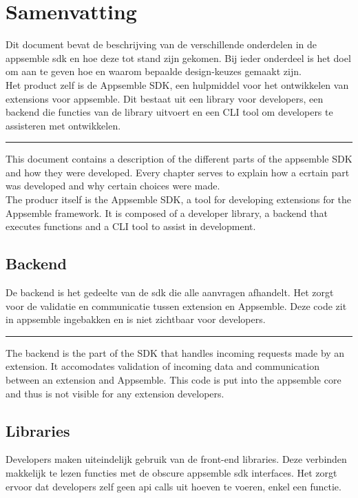 \chapter{Samenvatting}

Dit document bevat de beschrijving van de verschillende onderdelen in de appsemble sdk en hoe deze tot stand zijn gekomen. Bij ieder onderdeel is het doel om aan te geven hoe en waarom bepaalde design-keuzes gemaakt zijn. \\

Het product zelf is de Appsemble SDK, een hulpmiddel voor het ontwikkelen van extensions voor appsemble. Dit bestaat uit een library voor developers, een backend die functies van de library uitvoert en een CLI tool om developers te assisteren met ontwikkelen.

\noindent\rule[0.5ex]{\linewidth}{1pt}

This document contains a description of the different parts of the appsemble SDK and how they were developed. Every chapter serves to explain how a ecrtain part was developed and why certain choices were made. \\

The producr itself is the Appsemble SDK, a tool for developing extensions for the Appsemble framework. It is composed of a developer library, a backend that executes functions and a CLI tool to assist in development.

\section{Backend}

De backend is het gedeelte van de sdk die alle aanvragen afhandelt. Het zorgt voor de validatie en communicatie tussen extension en Appsemble. Deze code zit in appsemble ingebakken en is niet zichtbaar voor developers. 

\noindent\rule[0.5ex]{\linewidth}{1pt}

The backend is the part of the SDK that handles incoming requests made by an extension. It accomodates validation of incoming data and communication between an extension and Appsemble. This code is put into the appsemble core and thus is not visible for any extension developers.

\section{Libraries}

Developers maken uiteindelijk gebruik van de front-end libraries. Deze verbinden makkelijk te lezen functies met de obscure appsemble sdk interfaces. Het zorgt ervoor dat developers zelf geen api calls uit hoeven te voeren, enkel een functie.

